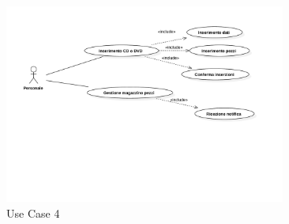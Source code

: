 \documentclass[a4paper,titlepage]{book}
\begin{document}
\begin{figure}[H]
\center
\includegraphics[width=350px]{img/Use4.pdf}
\caption{Use Case 4 \label{fig:use4}}
\end{figure}
\end{document}
